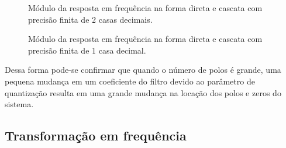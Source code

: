 \documentclass[12pt]{article}
\begin{document}
\begin{figure}[H]
\caption{Módulo da resposta em frequ\^encia na forma direta e cascata com precis\~ao finita de 2 casas decimais.}
\label{precisao_finita2}
\end{figure}

\begin{figure}[H]
\caption{Módulo da resposta em frequ\^encia na forma direta e cascata com precis\~ao finita de 1 casa decimal.}
\label{precisao_finita1}
\end{figure}

Dessa forma pode-se confirmar que quando o n\'umero de polos \'e grande, uma pequena mudan\c ca em um coeficiente do filtro devido ao par\^ametro de quantiza\c c\~ao resulta em uma grande mudan\c ca na loca\c c\~ao dos polos e zeros do sistema.

\subsection{Transforma\c c\~ao em frequ\^encia}
\end{document}

